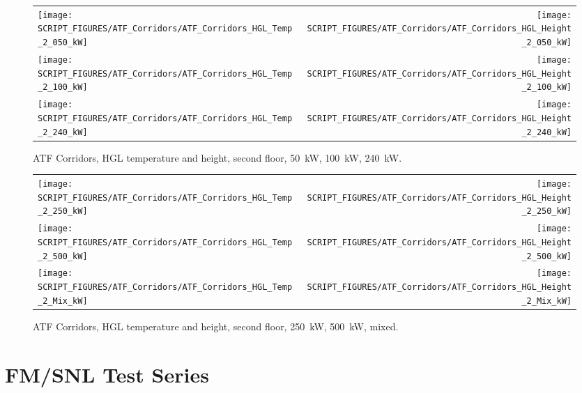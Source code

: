 \begin{figure}[p]
\begin{tabular*}{\textwidth}{l@{\extracolsep{\fill}}r}
\texttt{[image: SCRIPT\_FIGURES/ATF\_Corridors/ATF\_Corridors\_HGL\_Temp\_2\_050\_kW]} &
\texttt{[image: SCRIPT\_FIGURES/ATF\_Corridors/ATF\_Corridors\_HGL\_Height\_2\_050\_kW]} \\
\texttt{[image: SCRIPT\_FIGURES/ATF\_Corridors/ATF\_Corridors\_HGL\_Temp\_2\_100\_kW]} &
\texttt{[image: SCRIPT\_FIGURES/ATF\_Corridors/ATF\_Corridors\_HGL\_Height\_2\_100\_kW]} \\
\texttt{[image: SCRIPT\_FIGURES/ATF\_Corridors/ATF\_Corridors\_HGL\_Temp\_2\_240\_kW]} &
\texttt{[image: SCRIPT\_FIGURES/ATF\_Corridors/ATF\_Corridors\_HGL\_Height\_2\_240\_kW]}
\end{tabular*}
\caption[ATF Corridors, HGL temperature and height, second floor, 50~kW, 100~kW, 240~kW]
{ATF Corridors, HGL temperature and height, second floor, 50~kW, 100~kW, 240~kW.}
\label{ATF_Corridors_HGL_3}
\end{figure}

\begin{figure}[p]
\begin{tabular*}{\textwidth}{l@{\extracolsep{\fill}}r}
\texttt{[image: SCRIPT\_FIGURES/ATF\_Corridors/ATF\_Corridors\_HGL\_Temp\_2\_250\_kW]} &
\texttt{[image: SCRIPT\_FIGURES/ATF\_Corridors/ATF\_Corridors\_HGL\_Height\_2\_250\_kW]} \\
\texttt{[image: SCRIPT\_FIGURES/ATF\_Corridors/ATF\_Corridors\_HGL\_Temp\_2\_500\_kW]} &
\texttt{[image: SCRIPT\_FIGURES/ATF\_Corridors/ATF\_Corridors\_HGL\_Height\_2\_500\_kW]} \\
\texttt{[image: SCRIPT\_FIGURES/ATF\_Corridors/ATF\_Corridors\_HGL\_Temp\_2\_Mix\_kW]} &
\texttt{[image: SCRIPT\_FIGURES/ATF\_Corridors/ATF\_Corridors\_HGL\_Height\_2\_Mix\_kW]}
\end{tabular*}
\caption[ATF Corridors, HGL temperature and height, second floor, 250~kW, 500~kW, mixed]
{ATF Corridors, HGL temperature and height, second floor, 250~kW, 500~kW, mixed.}
\label{ATF_Corridors_HGL_4}
\end{figure}

\clearpage


\section{FM/SNL Test Series}

